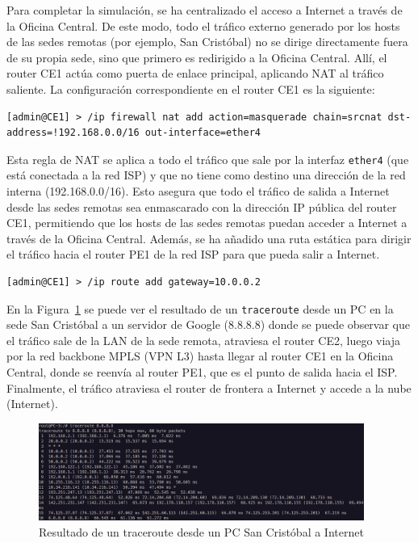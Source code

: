 \vspace{0.5cm}
Para completar la simulación, se ha centralizado el acceso a Internet a través de la Oficina Central. De este modo,
todo el tráfico externo generado por los hosts de las sedes remotas (por ejemplo, San Cristóbal) no se dirige directamente fuera de su propia sede, sino que primero es redirigido a la Oficina Central. Allí, el router CE1 actúa como puerta de enlace principal, aplicando NAT al tráfico saliente. La configuración correspondiente en el router CE1 es la siguiente:

\begin{lstlisting}[language=RouterOS]
[admin@CE1] > /ip firewall nat add action=masquerade chain=srcnat dst-address=!192.168.0.0/16 out-interface=ether4
\end{lstlisting}

Esta regla de NAT se aplica a todo el tráfico que sale por la interfaz \texttt{ether4} (que está conectada a la red ISP) y que no tiene como destino una dirección de la red interna (192.168.0.0/16). Esto asegura que todo el tráfico de salida a Internet desde las sedes remotas sea enmascarado con la dirección IP pública del router CE1, permitiendo que los hosts de las sedes remotas puedan acceder a Internet a través de la Oficina Central. Además, se ha añadido una ruta estática para dirigir el tráfico hacia el router PE1 de la red ISP para que pueda salir a Internet.
\begin{lstlisting}[language=RouterOS]
[admin@CE1] > /ip route add gateway=10.0.0.2
\end{lstlisting}

En la Figura~\ref{traceroutePC3} se puede ver el resultado de un \texttt{traceroute} desde un PC en la sede San Cristóbal a un servidor de Google (8.8.8.8) donde se puede observar que el tráfico sale de la LAN de la sede remota, atraviesa el router CE2, luego viaja por la red backbone MPLS (VPN L3) hasta llegar al router CE1 en la Oficina Central, donde se reenvía al router PE1, que es el punto de salida hacia el ISP. Finalmente, el tráfico atraviesa el router de frontera a Internet y accede a la nube (Internet).

\begin{figure}[htb]
	\centering
	\includegraphics[width=0.95\textwidth]{images/traceroute_PC3_toInternet.png}
	\caption{Resultado de un traceroute desde un PC San Cristóbal a Internet}
	\label{traceroutePC3}
\end{figure}

